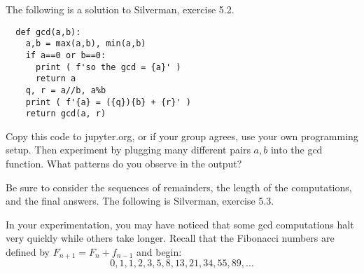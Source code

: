 \documentclass[12pt]{exam}
\begin{document}
\begin{questions}
  \question The following is a solution to Silverman, exercise 5.2.
  \begin{lstlisting}
  def gcd(a,b):
    a,b = max(a,b), min(a,b)
    if a==0 or b==0:
      print ( f'so the gcd = {a}' )
      return a
    q, r = a//b, a%b
    print ( f'{a} = ({q}){b} + {r}' )
    return gcd(a, r)
  \end{lstlisting}
  Copy this code to jupyter.org, or if your group agrees, use your own programming setup. Then experiment by plugging many different pairs $a,b$ into the gcd function. What patterns do you observe in the output?
  
  Be sure to consider the sequences of remainders, the length of the computations, and the final answers.
  \newpage
  \question The following is Silverman, exercise 5.3.
  \newpage
  \question In your experimentation, you may have noticed that some gcd computations halt very quickly while others take longer. Recall that the Fibonacci numbers are defined by $F_{n+1}=F_n+f_{n-1}$ and begin:
  \[0,1,1,2,3,5,8,13,21,34,55,89,\ldots
  \]
\end{questions}
\end{document}
